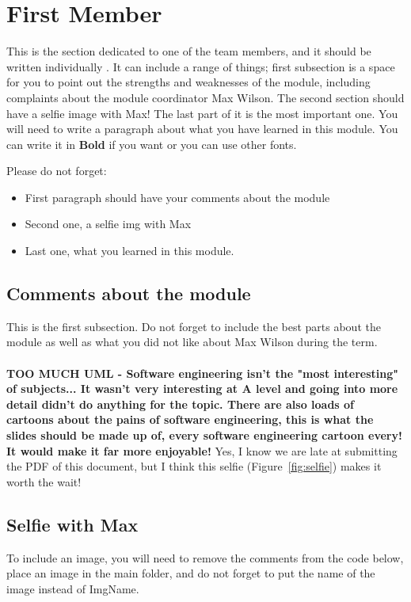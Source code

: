 \section{First Member}
This is the section dedicated to one of the team members, and it should be written individually . It can include a range of things; first subsection is a space for you to point out the strengths and weaknesses of the module, including complaints about the module coordinator Max Wilson. The second section should have a selfie image with Max! The last part of it is the most important one. You will need to write a paragraph about what you have learned in this module. You can write it in \textbf{Bold} if you want or you can use other fonts. 

Please do not forget:
\begin{itemize}
	\item First paragraph should have your comments about the module
	\item Second one, a selfie img with Max
	\item Last one, what you learned in this module.
\end{itemize}

\subsection{Comments about the module}
This is the first subsection. Do not forget to include the best parts about the module as well as what you did not like about Max Wilson during the term.\\\\

\textbf{TOO MUCH UML - Software engineering isn't the "most interesting" of subjects... It wasn't very interesting at A level and going into more detail didn't do anything for the topic.
There are also loads of cartoons about the pains of software engineering, this is what the slides should be made up of, every software engineering cartoon every! It would make it far more enjoyable!
}
Yes, I know we are late at submitting the PDF of this document, but I think this selfie (Figure~\ref{fig:selfie}) makes it worth the wait!

\subsection{Selfie with Max}

To include an image, you will need to remove the comments from the code below, place an image in the main folder, and do not forget to put the name of the image instead of ImgName. 

